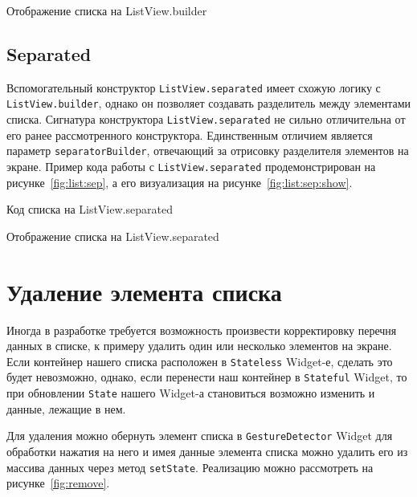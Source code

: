 \begin{image}
	\caption{Отображение списка на ListView.builder}
	\label{fig:list:show}
\end{image}

\subsection{Separated}

Вспомогательный конструктор \texttt{ListView.separated}
имеет схожую логику с \texttt{ListView.builder},
однако он позволяет создавать разделитель между элементами списка.
Сигнатура конструктора \texttt{ListView.separated}
не сильно отличительна от его ранее рассмотренного конструктора.
Единственным отличием является параметр \texttt{separatorBuilder},
отвечающий за отрисовку разделителя элементов на экране.
Пример кода работы с \texttt{ListView.separated}
продемонстрирован на рисунке~\ref{fig:list:sep},
а его визуализация на рисунке~\ref{fig:list:sep:show}.

\begin{image}
	\caption{Код списка на ListView.separated}
	\label{fig:list:sep}
\end{image}

\begin{image}
	\caption{Отображение списка на ListView.separated}
	\label{fig:list:sep:show}
\end{image}

\section{Удаление элемента списка}

Иногда в разработке требуется возможность произвести
корректировку перечня данных в списке, к примеру удалить один
или несколько элементов на экране.
Если контейнер нашего списка расположен в \texttt{Stateless} Widget-е,
сделать это будет невозможно, однако,
если перенести наш контейнер в \texttt{Stateful} Widget,
то при обновлении \texttt{State} нашего Widget-а
становиться возможно изменить и данные, лежащие в нем.\par
Для удаления можно обернуть элемент списка в \texttt{GestureDetector} Widget
для обработки нажатия на него и имея данные элемента списка можно удалить его
из массива данных через метод \texttt{setState}.
Реализацию можно рассмотреть на рисунке~\ref{fig:remove}.


